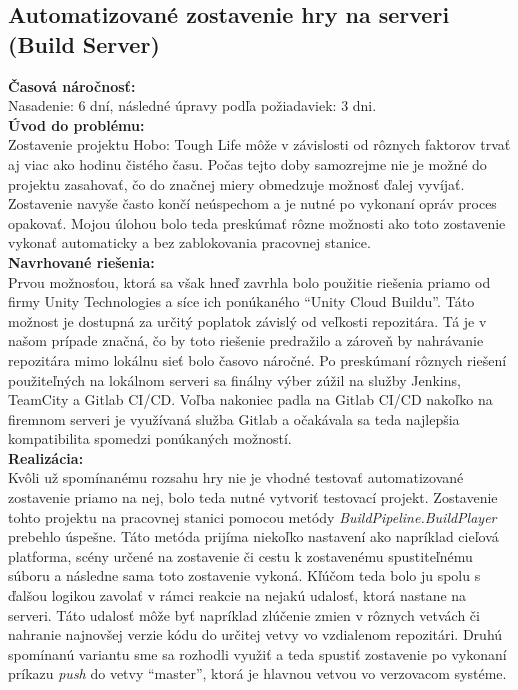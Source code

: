 \documentclass[slovak, bachelorpractice]{diploma}
\begin{document}
\subsection{Automatizované zostavenie hry na serveri (Build Server)}
\label{sec:BuildServer}
\textbf{Časová náročnosť:} \\ Nasadenie: 6 dní, následné úpravy podľa požiadaviek: 3 dni.\\
\textbf{Úvod do problému:} \\ Zostavenie projektu Hobo: Tough Life môže v závislosti od rôznych faktorov trvať aj viac ako hodinu čistého času. Počas tejto doby samozrejme nie je možné do projektu zasahovať, čo do značnej miery obmedzuje možnosť ďalej vyvíjať. Zostavenie navyše často končí neúspechom a je nutné po vykonaní opráv proces opakovať. Mojou úlohou bolo teda preskúmať rôzne možnosti ako toto zostavenie vykonať automaticky a bez zablokovania pracovnej stanice. \\
\textbf{Navrhované riešenia:} \\ Prvou možnosťou, ktorá sa však hneď zavrhla bolo použitie riešenia priamo od firmy Unity Technologies a síce ich ponúkaného \enquote{Unity Cloud Buildu}. Táto možnost je dostupná za určitý poplatok závislý od veľkosti repozitára. Tá je v našom prípade značná, čo by toto riešenie predražilo a zároveň by nahrávanie repozitára mimo lokálnu sieť bolo časovo náročné. Po preskúmaní rôznych riešení použiteľných na lokálnom serveri sa finálny výber zúžil na služby Jenkins, TeamCity a Gitlab \mbox{CI/CD}. Voľba nakoniec padla na Gitlab CI/CD nakoľko na firemnom serveri je využívaná služba Gitlab a očakávala sa teda najlepšia kompatibilita spomedzi ponúkaných možností.\\
\textbf{Realizácia:} \\ Kvôli už spomínanému rozsahu hry nie je vhodné testovať automatizované zostavenie priamo na nej, bolo teda nutné vytvoriť testovací projekt. Zostavenie tohto projektu na pracovnej stanici pomocou metódy \textit{BuildPipeline.BuildPlayer} prebehlo úspešne. Táto metóda prijíma niekoľko nastavení ako napríklad cieľová platforma, scény určené na zostavenie či cestu k zostavenému spustiteľnému súboru a následne sama toto zostavenie vykoná. Kľúčom teda bolo ju spolu s ďalšou logikou zavolať v rámci reakcie na nejakú udalosť, ktorá nastane na serveri. Táto udalosť môže byť napríklad zlúčenie zmien v rôznych vetvách či nahranie najnovšej verzie kódu do určitej vetvy vo vzdialenom repozitári. Druhú spomínanú variantu sme sa rozhodli využiť a teda spustiť zostavenie po vykonaní príkazu \textit{push} do vetvy \enquote{master}, ktorá je hlavnou vetvou vo verzovacom systéme.
\end{document}
